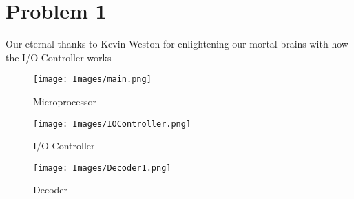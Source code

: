 \section*{Problem 1}
\noindent
Our eternal thanks to Kevin Weston for enlightening our mortal brains with how the I/O Controller works
\begin{figure}[!ht]
    \centering
    \texttt{[image: Images/main.png]}
    \caption{Microprocessor}
\end{figure}

\begin{figure}[!ht]
    \centering
    \texttt{[image: Images/IOController.png]}
    \caption{I/O Controller}
\end{figure}

\begin{figure}[!ht]
    \centering
    \texttt{[image: Images/Decoder1.png]}
    \caption{Decoder}
\end{figure}